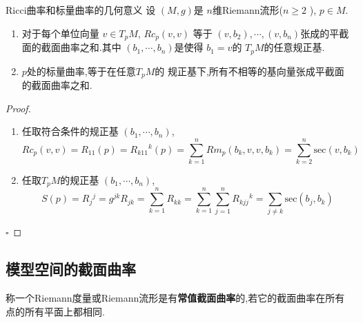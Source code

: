\documentclass[../../几何与拓扑.tex]{subfiles}
\begin{document}
\begin{proposition}{Ricci曲率和标量曲率的几何意义}
    设 \(  \left( M,g \right)   \)是 \(  n  \)维Riemann流形(\(  n\ge 2  \) ), \(  p \in M  \).   
    \begin{enumerate}
        \item 对于每个单位向量 \(  v \in T_{p}M  \), \(  Rc_{p}\left( v,v \right)   \)  等于 \(  \left( v,b_2 \right),\cdots ,\left( v,b_{n} \right)    \)张成的平截面的截面曲率之和.其中 \(  \left( b_1,\cdots ,b_{n} \right)   \)是使得 \(  b_1= v  \)的 \(  T_{p}M  \)的任意规正基.
        \item  \(  p  \)处的标量曲率,等于在任意\(  T_{p}M  \)的 规正基下,所有不相等的基向量张成平截面的截面曲率之和.  
    \end{enumerate}
    
\end{proposition}
\begin{proof}
    \begin{enumerate}
        \item 任取符合条件的规正基 \(  \left(  b_1,\cdots,b_n  \right)   \), \[
        Rc_{p}\left( v,v \right)= R_{11}\left( p \right)= R_{k 1 1}{}^{k}\left( p \right)=   \sum _{k= 1}^{n}Rm_{p}\left( b_{k},v,v,b_{k} \right)= \sum _{k=2}^{n}\mathrm{sec}\left( v,b_{k} \right)   
        \] 
        \item 任取\(  T_{p}M  \)的规正基 \(  \left(  b_1,\cdots,b_n  \right)   \), \[
        S\left( p \right)= R_{j}{}^{j}= g^{jk}R_{jk}= \sum _{k= 1}^{n}R_{kk}=\sum _{k= 1}^{n}\sum _{j= 1}^{n}R_{k j j } {}^{k}= \sum _{j \neq k} \mathrm{sec}\left( b_{j},b_{k} \right)   
        \]  
    \end{enumerate}
    

    \hfill $\square$
\end{proof}

\subsection{模型空间的截面曲率}

\begin{definition}
    称一个Riemann度量或Riemann流形是有\textbf{常值截面曲率}的,若它的截面曲率在所有点的所有平面上都相同.
\end{definition}
\end{document}
